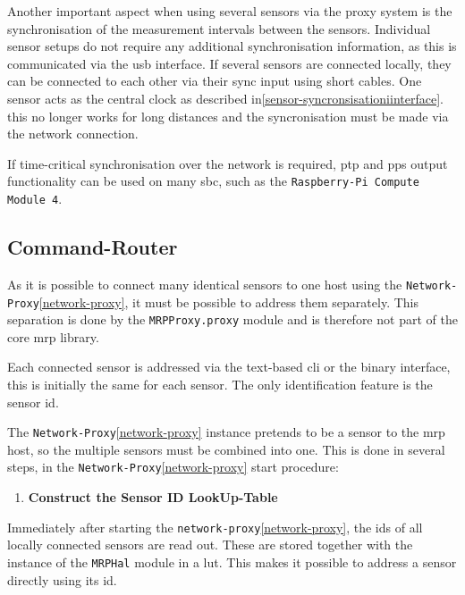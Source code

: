 Another important aspect when using several sensors via the proxy system
is the synchronisation of the measurement intervals between the sensors.
Individual sensor setups do not require any additional synchronisation
information, as this is communicated via the \gls{usb} interface. If
several sensors are connected locally, they can be connected to each
other via their sync input using short cables. One sensor acts as the
central clock as described in\ref{sensor-syncronsisationiinterface}.
this no longer works for long distances and the syncronisation must be
made via the network connection.

If time-critical synchronisation over the network is required, \gls{ptp}
and \gls{pps} output functionality\cite{PTPIEEE1588} can be used on
many \gls{sbc}, such as the
\passthrough{\lstinline!Raspberry-Pi Compute Module 4!}.

\hypertarget{command-router}{%
\subsection{Command-Router}\label{command-router}}

As it is possible to connect many identical sensors to one host using
the \passthrough{\lstinline!Network-Proxy!}\ref{network-proxy}, it must
be possible to address them separately. This separation is done by the
\passthrough{\lstinline!MRPProxy.proxy!} module and is therefore not
part of the core \gls{mrp} library.

Each connected sensor is addressed via the text-based \gls{cli} or the
binary interface, this is initially the same for each sensor. The only
identification feature is the sensor \gls{id}.

The \passthrough{\lstinline!Network-Proxy!}\ref{network-proxy} instance
pretends to be a sensor to the \gls{mrp} host, so the multiple sensors
must be combined into one. This is done in several steps, in the
\passthrough{\lstinline!Network-Proxy!}\ref{network-proxy} start
procedure:

\begin{enumerate}
\def\labelenumi{\arabic{enumi}.}
\tightlist
\item
  \textbf{Construct the Sensor ID LookUp-Table}
\end{enumerate}

Immediately after starting the
\passthrough{\lstinline!network-proxy!}\ref{network-proxy}, the
\gls{id}s of all locally connected sensors are read out. These are
stored together with the instance of the
\passthrough{\lstinline!MRPHal!} module in a \gls{lut}. This makes it
possible to address a sensor directly using its \gls{id}.

